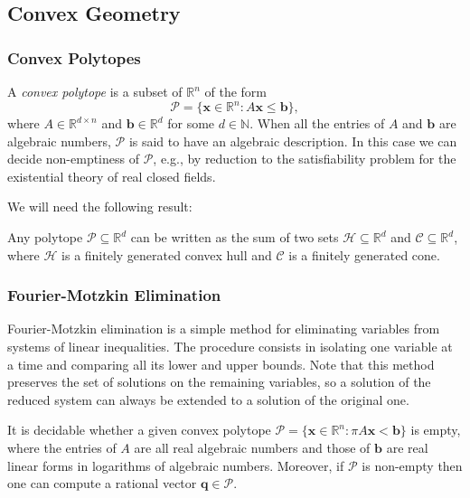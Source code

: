 \documentclass[format=acmsmall, review=false, screen=true]{acmart}
\newcommand{\Reals}{\mathbb{R}}
\newcommand{\myvector}{\boldsymbol}
\begin{document}
\subsection{Convex Geometry}

\subsubsection{Convex Polytopes}

A \emph{convex polytope} is a subset of $\Reals^{n}$ of the form
\begin{equation*}
\mathcal{P} = \lbrace \myvector{x} \in \Reals^{n} : A \myvector{x} \leq \myvector{b} \rbrace ,
\end{equation*}
where $A \in \Reals^{d \times n}$ and $\myvector{b} \in \Reals^{d}$
for some $d\in\mathbb{N}$. When all the entries of $A$ and
$\myvector{b}$ are algebraic numbers, $\mathcal{P}$ is said to have an
algebraic description.  In this case we can decide non-emptiness of
$\mathcal{P}$, e.g., by reduction to the satisfiability problem for the
existential theory of real closed fields.

We will need the following result:
\begin{theorem}
  Any polytope $\mathcal{P} \subseteq \mathbb{R}^{d}$ can be written
  as the sum of two sets $\mathcal{H} \subseteq \mathbb{R}^{d}$ and
  $\mathcal{C} \subseteq \mathbb{R}^{d}$, where $\mathcal{H}$ is a
  finitely generated convex hull and $\mathcal{C}$ is a finitely
  generated cone.
\end{theorem}

\subsubsection{Fourier-Motzkin Elimination}

Fourier-Motzkin elimination is a simple method for eliminating
variables from systems of linear inequalities. The procedure consists
in isolating one variable at a time and comparing all its lower and
upper bounds. Note that this method preserves the set of solutions on
the remaining variables, so a solution of the reduced system can
always be extended to a solution of the original one.

\begin{proposition}
\label{thm:fme}
  It is decidable whether a given convex polytope $\mathcal{P}
  = \lbrace \myvector{x} \in \Reals^{n} : \pi A\myvector{x}
  < \myvector{b} \rbrace$ is empty, where the entries of $A$ are all
  real algebraic numbers and those of $\myvector{b}$ are real linear
  forms in logarithms of algebraic numbers.  Moreover, if
  $\mathcal{P}$ is non-empty then one can compute a rational vector
  $\myvector{q} \in \mathcal{P}$.
\end{proposition}
\end{document}
